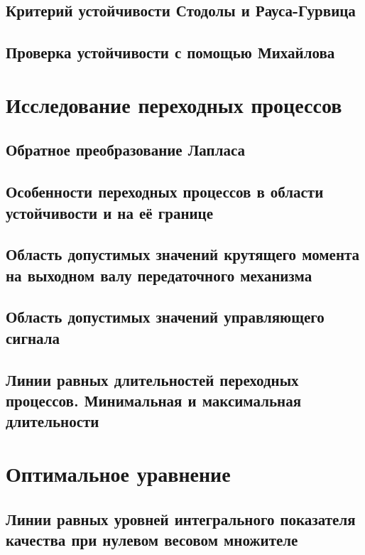 \documentclass[14pt]{extreport}
\begin{document}
{        \subsection{Критерий устойчивости Стодолы и Рауса-Гурвица}

        \subsection{Проверка устойчивости с помощью Михайлова}

        \newpage

        \section{Исследование переходных процессов}

        \subsection{Обратное преобразование Лапласа}

        \subsection{Особенности переходных процессов в области устойчивости и на её границе}

        \subsection{Область допустимых значений крутящего момента на выходном валу передаточного механизма}

        \subsection{Область допустимых значений управляющего сигнала}

        \subsection{Линии равных длительностей переходных процессов. Минимальная и максимальная длительности}

        \newpage
        

        \section{Оптимальное уравнение}

        \subsection{Линии равных уровней интегрального показателя качества при нулевом весовом множителе}

}
\end{document}
